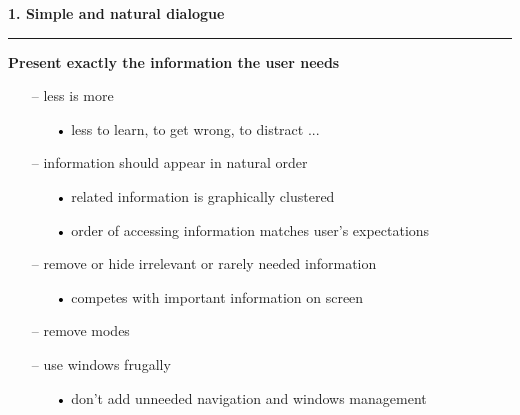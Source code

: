 \documentclass[pdf]{beamer}
\begin{document}
\begin{frame}
{\textbf{1. Simple and natural dialogue}}{\textcolor{red}{\rule{12cm}{1.2pt}}}

    \textbf{Present exactly the information the user needs}
    \begin{itemize}
    	\item[--] less is more 
        \begin{itemize}
        	 \item[\textcolor{black}{•}] less to learn, to get wrong, to distract ...
        \end{itemize}
        \bigskip
        \item[--] information should appear in natural order
        \begin{itemize}
        	\item[\textcolor{black}{•}] related information is graphically clustered
            \item[\textcolor{black}{•}] order of accessing information matches user's 									      expectations
        \end{itemize}
        \bigskip
        \item[--] remove or hide irrelevant or rarely needed information
        \begin{itemize}
         	\item[\textcolor{black}{•}] competes with important information on screen
        \end{itemize}
        \bigskip
        \item[--] remove modes
        \bigskip
        \item[--] use windows frugally
        \begin{itemize}
         	\item[\textcolor{black}{•}] don't add unneeded navigation and windows management
        \end{itemize}
    \end{itemize}
  
\end{frame}
\end{document}
